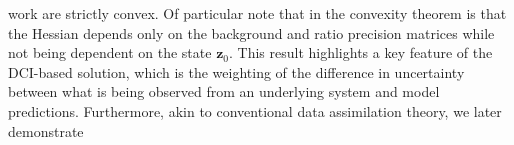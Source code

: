 \documentclass[final,1p,times]{elsarticle}
\begin{document}
 work are strictly convex. 
Of particular note that in the convexity theorem is that the Hessian depends only on the background and ratio precision matrices while not being dependent on the state $\mathbf{z}_{0}$. 
This result highlights a key feature of the DCI-based solution, which is the weighting of the difference in uncertainty between what is being observed from an underlying system and model predictions. 
Furthermore, akin to conventional data assimilation theory, we later demonstrate
\end{document}
